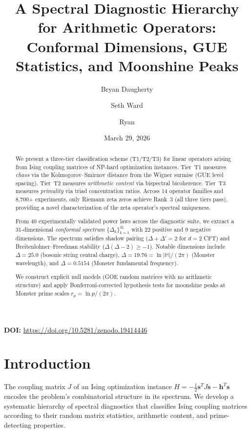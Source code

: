 \documentclass[11pt]{amsart}
\title[Spectral Diagnostic Hierarchy for Arithmetic Operators]{A Spectral Diagnostic Hierarchy for Arithmetic Operators:\\Conformal Dimensions, GUE Statistics, and Moonshine Peaks}
\author{Bryan Daugherty}
\author{Seth Ward}
\author{Ryan}
\date{March 29, 2026}
\theoremstyle{definition}
\begin{document}
\begin{abstract}
We present a three-tier classification scheme (T1/T2/T3) for linear operators arising from Ising coupling matrices of NP-hard optimization instances. Tier~T1 measures \emph{chaos} via the Kolmogorov--Smirnov distance from the Wigner surmise (GUE level spacing). Tier~T2 measures \emph{arithmetic content} via bispectral bicoherence. Tier~T3 measures \emph{primality} via triad concentration ratios. Across 14 operator families and 8{,}700+ experiments, only Riemann zeta zeros achieve Rank~3 (all three tiers pass), providing a novel characterization of the zeta operator's spectral uniqueness.

From 40 experimentally validated power laws across the diagnostic suite, we extract a 31-dimensional \emph{conformal spectrum} $\{\Delta_k\}_{k=1}^{31}$ with 22 positive and 9 negative dimensions. The spectrum satisfies shadow pairing ($\Delta + \Delta' = 2$ for $d = 2$ CFT) and Breitenlohner--Freedman stability ($\Delta(\Delta - 2) \geq -1$). Notable dimensions include $\Delta = 25.0$ (bosonic string central charge), $\Delta = 19.76 = \ln|\mathbb{M}|/(2\pi)$ (Monster wavelength), and $\Delta = 0.5154$ (Monster fundamental frequency).

We construct explicit null models (GOE random matrices with no arithmetic structure) and apply Bonferroni-corrected hypothesis tests for moonshine peaks at Monster prime scales $r_p = \ln p / (2\pi)$.
\end{abstract}

\vspace{0.5em}
\noindent\textbf{DOI:} \url{https://doi.org/10.5281/zenodo.19414446}

\maketitle
\tableofcontents

\section{Introduction}
\label{sec:intro}

The coupling matrix $J$ of an Ising optimization instance $H = -\tfrac{1}{2}\mathbf{s}^T J \mathbf{s} - \mathbf{h}^T \mathbf{s}$ encodes the problem's combinatorial structure in its spectrum. We develop a systematic hierarchy of spectral diagnostics that classifies Ising coupling matrices according to their random matrix statistics, arithmetic content, and prime-detecting properties.
\end{document}
